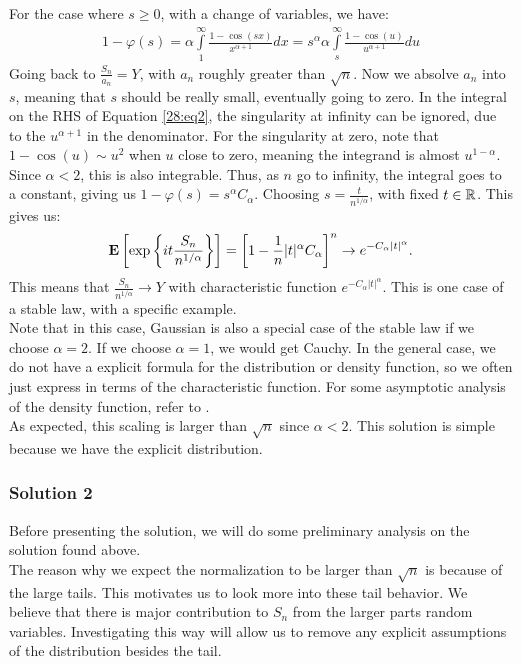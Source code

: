 \documentclass[../main/main.tex]{subfiles}
\begin{document}
For the case where $s \geq 0$, with a change of variables, we have:
\begin{align}\label{28:eq2}
	1-\varphi(s)  = \alpha \int\limits_{1}^{\infty} \frac{1-\cos(sx)}{x^{\alpha+1}} dx=
	s^{\alpha} \alpha \int\limits_{s}^{\infty} \frac{1-\cos(u)}{u^{\alpha+1}}du
\end{align}
Going back to $\frac{S_n}{a_n} = Y$, with $a_n$ roughly greater than $\sqrt{n}$. Now we absolve $a_n$ into $s$, meaning that $s$ should be really small, eventually going to zero. In the integral on the RHS of Equation \ref{28:eq2}, the singularity at infinity can be ignored, due to the $u^{\alpha+1}$ in the denominator. For the singularity at zero, note that $1-\cos(u)\sim u^2$ when $u$ close to zero, meaning the integrand is almost $u^{1-\alpha}$. Since $\alpha < 2$, this is also integrable. Thus, as $n$ go to infinity, the integral goes to a constant, giving us $1-\varphi(s) = s^{\alpha}C_\alpha$. Choosing $s=\frac{t}{n^{1 / \alpha}}$, with fixed $t \in \mathbb{R}$. This gives us:
\[
	\text{\textbf{E}}\left[\exp\left\{it \frac{S_n}{n^{1 / \alpha}}\right\}\right] = \left[1-\frac{1}{n}|t|^{\alpha}C_\alpha\right]^{n} \to e^{-C_{\alpha}|t|^{\alpha}}.
\] This means that $\frac{S_n}{n^{1 / \alpha}} \to Y$ with characteristic function $e^{-C_{\alpha}|t|^{\alpha}}$. This is one case of a stable law, with a specific example.\\

Note that in this case, Gaussian is also a special case of the stable law if we choose $\alpha=2$. If we choose $\alpha=1$, we would get Cauchy. In the general case, we do not have a explicit formula for the distribution or density function, so we often just express in terms of the characteristic function. For some asymptotic analysis of the density function, refer to \cite{Nol20}.\\

As expected, this scaling is larger than $\sqrt{n}$ since $\alpha < 2$. This solution is simple because we have the explicit distribution.

\subsubsection*{Solution 2}
Before presenting the solution, we will do some preliminary analysis on the solution found above.\\

The reason why we expect the normalization to be larger than $\sqrt{n}$ is because of the large tails. This motivates us to look more into these tail behavior. We believe that there is major contribution to $S_n$ from the larger parts random variables. Investigating this way will allow us to remove any explicit assumptions of the distribution besides the tail.\\
\end{document}
